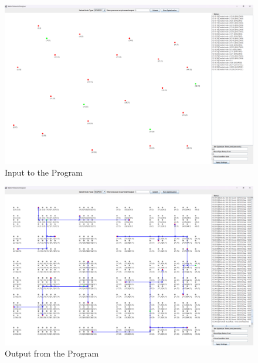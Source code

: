 \begin{landscape}
\begin{figure}[H]
    \centering
    \includegraphics[width=0.9\linewidth]{input.png}
    \caption{Input to the Program}
    \label{fig:testinput}
\end{figure}
\begin{figure}[H]
    \centering
    \includegraphics[width=0.9\linewidth]{output.png}
    \caption{Output from the Program}
    \label{fig:testoutput}
\end{figure}
\end{landscape}